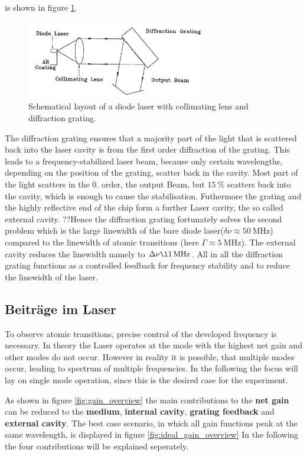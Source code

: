 is shown in figure \ref{fig:aufbau}.
\begin{figure}
  \centering
  \includegraphics[width=0.7\textwidth]{aufbau.png}
  \caption{Schematical layout of a diode laser with collimating lens and diffraction grating.\cite{V61}}
  \label{fig:aufbau}
\end{figure}

The diffraction grating ensures that a majority part of
the light that is scattered back into the laser cavity is from the first order
diffraction of the grating. This leads to
a frequency-stabilized laser beam, because only certain wavelengths,
depending on the position
of the grating, scatter back in the cavity.
Most part of the light scatters in the 0. order,
the output Beam, but $\SI{15}{\percent}$ scatters back into
the cavity, which is enough to cause the stabilisation.
Futhermore the grating and the highly reflective end of the chip form a
further Laser cavity,
the so called external cavity.
??Hence the diffraction grating fortunately solves the second
problem which is the large linewidth of the bare
diode laser($\delta \nu \approx \SI{50}{\mega\hertz}$)
compared to the linewidth of atomic transitions
(here $\Gamma \approx \SI{5}{\mega\hertz}$).
The external cavity
reduces the linewidth namely to $\Delta\nu\l \SI{1}{\mega\hertz}$.
All in all the diffraction grating
functions as a controlled feedback for frequency stability
and to reduce the linewidth of the laser.


\subsection{Beiträge im Laser}
\label{subsec:}
To observe atomic transitions, precise control
of the developed frequency is necessary.
In theory the Laser operates at the mode with the highest net gain
and other modes do not occur.
However in reality it is possible, that multiple modes occur, leading
to spectrum of multiple frequencies. In the following the focus will
lay on single mode operation, since this is the desired case
for the experiment.

As shown in figure \ref{fig:gain_overview} the main contributions
to the \textbf{net gain} can be reduced to
the \textbf{medium}, \textbf{internal cavity}, \textbf{grating feedback}
and  \textbf{external cavity}.
The best case scenario, in which all gain functions peak at the
same wavelength, is displayed in figure \ref{fig:ideal_gain_overview}
In the following the four contributions will be explained seperately.


